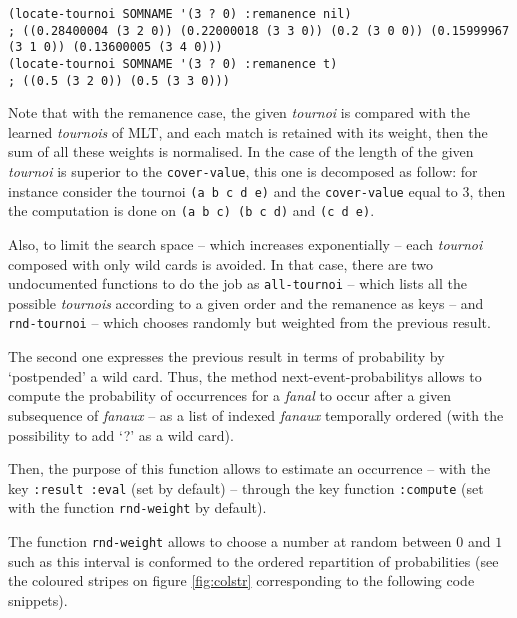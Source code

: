 \bigskip
\begin{lstlisting}[language=N3]
(locate-tournoi SOMNAME '(3 ? 0) :remanence nil)
; ((0.28400004 (3 2 0)) (0.22000018 (3 3 0)) (0.2 (3 0 0)) (0.15999967 (3 1 0)) (0.13600005 (3 4 0)))
(locate-tournoi SOMNAME '(3 ? 0) :remanence t)
; ((0.5 (3 2 0)) (0.5 (3 3 0)))
\end{lstlisting}
\bigskip

Note that with the remanence case, the given \textit{tournoi} is compared with the learned \textit{tournois} of MLT, and each match is retained with its weight, then the sum of all these weights is normalised. In the case of the length of the given \textit{tournoi} is superior to the \texttt{cover-value}, this one is decomposed as follow: for instance consider the tournoi \texttt{(a b c d e)} and the \texttt{cover-value} equal to 3, then the computation is done on \texttt{(a b c) (b c d)} and  \texttt{(c d e)}.

\smallskip

Also, to limit the search space -- which increases exponentially -- each \textit{tournoi} composed with only wild cards is avoided. In that case, there are two undocumented functions to do the job as \texttt{all-tournoi} -- which lists all the possible \textit{tournois} according to a given order and the remanence as keys -- and \texttt{rnd-tournoi} -- which chooses randomly but weighted from the previous result.

\bigskip

The second one expresses the previous result in terms of probability by `postpended' a wild card. 
Thus, the method \glspl{next-event-probability} allows to compute the probability of occurrences for a \textit{fanal} to occur after a given subsequence of \textit{fanaux} -- as a list of indexed \textit{fanaux} temporally ordered (with the possibility to add `?' as a wild card).

\smallskip

Then, the purpose of this function allows to estimate an occurrence -- with the key \texttt{:result :eval} (set by default) -- through the key function \texttt{:compute} (set with the function \texttt{rnd-weight} by default). 

The function \texttt{rnd-weight} allows to choose a number at random between $0$ and $1$ such as this interval is conformed to the ordered repartition of probabilities (see the coloured stripes on figure \ref{fig:colstr} corresponding to the following code snippets).

\smallskip

